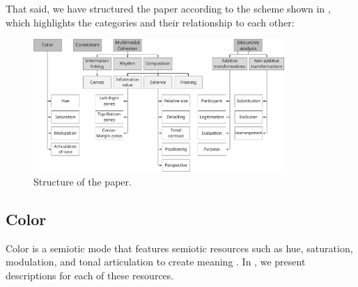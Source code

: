 \documentclass[english]{textolivre}
\begin{document}
That said, we have structured the paper according to the scheme shown in , which highlights the categories and their relationship to each other:

\begin{figure}[htbp]
 \centering
 \includegraphics[width=0.85\textwidth]{Fig-1.pdf}
 \caption{Structure of the paper.}
 \label{fig01}
\end{figure}

\subsection{Color}\label{sec-formato}
Color is a semiotic mode that features semiotic resources such as hue, saturation, modulation, and tonal articulation to create meaning \cite[p. 167]{van_leeuwen_introducing_2005}. In , we present descriptions for each of these resources.
\end{document}
